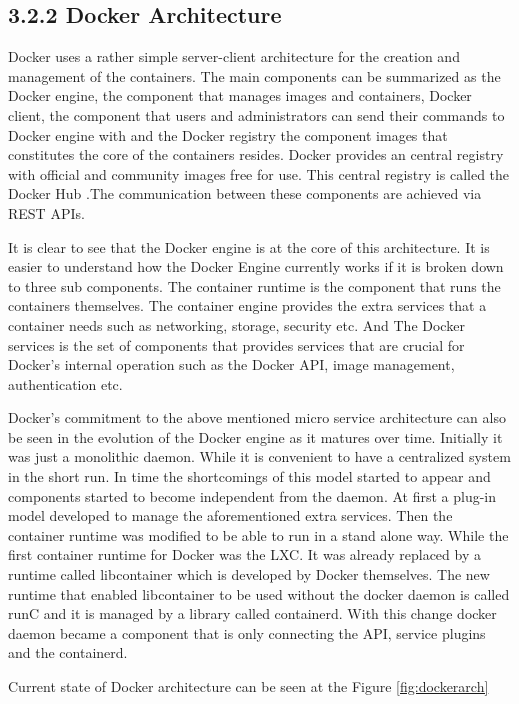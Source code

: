 \documentclass[12pt,oneandhalf,chaparabic,ceng,ms,eng,oneside,pntc]{gsufbe}
\begin{document}
\subsection[Docker Architecture]{3.2.2 Docker Architecture}
Docker uses a rather simple server-client architecture for the creation and management of the
containers.  The main components can be summarized as the Docker engine, the component that manages
images and containers, Docker client, the component that users and administrators can send their
commands to Docker engine with and the Docker registry the component images that constitutes the core of
the containers resides.  Docker provides an central registry with official and community images free for
use.  This central registry is called the Docker Hub \cite{docker_hub}
.The communication between these components are achieved via REST APIs.

It is clear to see that the Docker engine is at the core of this architecture.  It is easier to
understand how the Docker Engine currently works if it is broken down to three sub components.  The
container runtime is the component that runs the containers themselves.  The container engine provides
the extra services that a container needs such as networking, storage, security etc.  And The Docker 
services is the set of components that provides services that are crucial for Docker's internal
operation such as the Docker API, image management, authentication etc.

Docker's commitment to the above mentioned micro service architecture can also be seen in the evolution
of the Docker engine as it matures over time.  Initially it was just a monolithic daemon.  While it is
convenient to have a centralized system in the short run.  In time the shortcomings of this model
started to appear and components started to become independent from the daemon.  At first a plug-in
model developed to manage the aforementioned extra services.  Then the container runtime was modified to
be able to run in a stand alone way.  While the first container runtime for Docker was the LXC.  It was
already replaced by a runtime called libcontainer which is developed by Docker themselves.  The new
runtime that enabled libcontainer to be used without the docker daemon is called runC and it is managed
by a library called containerd.  With this change docker daemon became a component that is only
connecting the API, service plugins and the containerd.

Current state of Docker architecture can be seen at the Figure \ref{fig:dockerarch}
\end{document}
